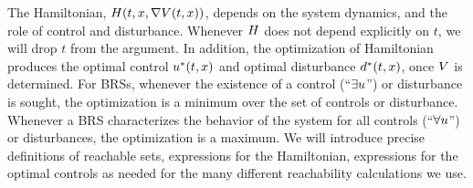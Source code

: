 The Hamiltonian, $H(t, x, \nabla V(t,x))$, depends on the system dynamics, and the role of control and disturbance. Whenever $H$ does not depend explicitly on $t$, we will drop $t$ from the argument. In addition, the optimization of Hamiltonian produces the optimal control $u^*(t, x)$ and optimal disturbance $d^*(t, x)$, once $V$ is determined. For BRSs, whenever the existence of a control (``$\exists u$'') or disturbance is sought, the optimization is a minimum over the set of controls or disturbance. Whenever a BRS characterizes the behavior of the system for all controls (``$\forall u$'') or disturbances, the optimization is a maximum. We will introduce precise definitions of reachable sets, expressions for the Hamiltonian, expressions for the optimal controls as needed for the many different reachability calculations we use. %
%
%
%
%
%
%
